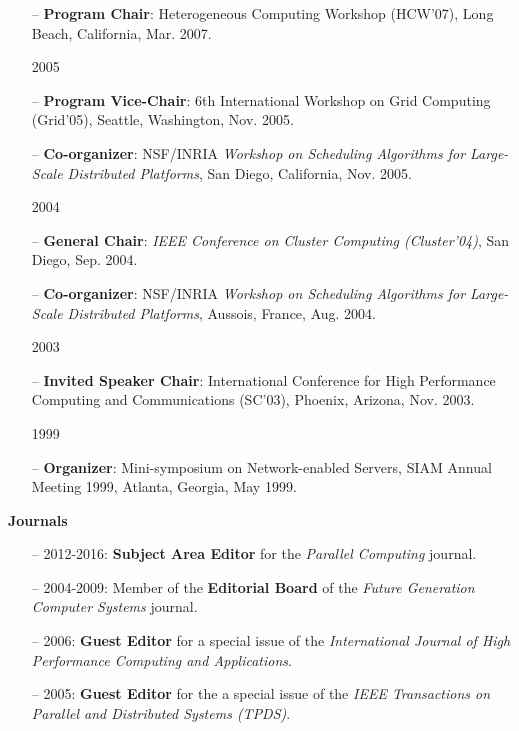 \documentclass[times,11pt]{letter}
\begin{document}
\begin{itemize}
\item[--] {\bf Program Chair}: Heterogeneous Computing Workshop (HCW'07), Long Beach, California, Mar. 2007.
\item [2005]
\item[--] {\bf Program Vice-Chair}: 6th International Workshop on Grid Computing (Grid'05), Seattle, Washington, Nov. 2005.
\item[--] {\bf Co-organizer}: NSF/INRIA \emph{Workshop on Scheduling Algorithms for Large-Scale Distributed Platforms}, San Diego, California, Nov. 2005.
\item [2004]
\item[--] {\bf General Chair}: \emph{IEEE Conference on Cluster Computing (Cluster'04)}, San Diego, Sep. 2004.
\item[--] {\bf Co-organizer}: NSF/INRIA \emph{Workshop on Scheduling Algorithms for Large-Scale Distributed Platforms}, Aussois, France, Aug. 2004.
\item [2003]
\item[--] {\bf Invited Speaker Chair}: International Conference for High Performance Computing and Communications (SC'03), Phoenix, Arizona, Nov. 2003.
\item [1999]
\item[--] {\bf Organizer}: Mini-symposium on Network-enabled Servers, SIAM Annual Meeting 1999, Atlanta, Georgia, May 1999.
\end{itemize}

\noindent
{\bf Journals}
\begin{itemize}
\item[--] 2012-2016: {\bf Subject Area Editor} for the \emph{Parallel Computing} journal.
\item[--] 2004-2009: Member of the {\bf Editorial Board} of the \emph{Future Generation Computer Systems} journal.
\item[--] 2006: {\bf Guest Editor} for a special issue of the \emph{International Journal of High Performance Computing and Applications}.
\item[--] 2005: {\bf Guest Editor} for the a special issue of the \emph{IEEE Transactions on Parallel and Distributed Systems (TPDS)}. 
\end{itemize}
\end{document}
